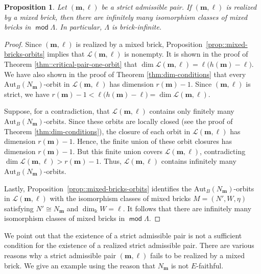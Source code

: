 \documentclass[a4,12pt]{amsart}
\numberwithin{equation}{section} %
\def\mod{\operatorname{\mathsf{mod}}}
\def\Aut{\mathrm{Aut}} %
\newtheorem{proposition}[theorem]{Proposition} %
\theoremstyle{definition} %
\begin{document}
\begin{proposition}\label{prop:strict-infinite-bricks}
Let $(\mathbf{m},\ell)$ be a strict admissible pair. If $(\mathbf{m},\ell)$ is realized by a mixed brick, then there are infinitely many isomorphism classes of mixed bricks in $\mod \Lambda$. In particular, $\Lambda$ is brick-infinite.
\end{proposition}
\begin{proof}
Since $(\mathbf{m},\ell)$ is realized by a mixed brick, Proposition~\ref{prop::mixed-bricks-orbits} implies that $\mathcal{L}(\mathbf{m},\ell)$ is nonempty. It is shown in the proof of Theorem \ref{thm::critical-pair-one-orbit} that $\dim \mathcal{L}(\mathbf{m},\ell)=\ell\bigl(h(\mathbf{m})-\ell\bigr)$. We have also shown in the proof of Theorem \ref{thm:dim-conditions} that every $\Aut_B(N_{\mathbf{m}})$-orbit in $\mathcal{L}(\mathbf{m},\ell)$ has dimension $r(\mathbf{m})-1$. Since $(\mathbf{m},\ell)$ is strict, we have $r(\mathbf{m})-1<\ell\bigl(h(\mathbf{m})-\ell\bigr)=\dim\mathcal{L}(\mathbf{m},\ell)$.

Suppose, for a contradiction, that $\mathcal{L}(\mathbf{m},\ell)$ contains only finitely many $\Aut_B(N_{\mathbf{m}})$-orbits. Since these orbits are locally closed (see the proof of Theorem \ref{thm:dim-conditions}), the closure of each orbit in $\mathcal{L}(\mathbf{m},\ell)$ has dimension $r(\mathbf{m})-1$. Hence, the finite union of these orbit closures has dimension $r(\mathbf{m})-1$. But this finite union covers $\mathcal{L}(\mathbf{m},\ell)$, contradicting $\dim\mathcal{L}(\mathbf{m},\ell)>r(\mathbf{m})-1$. Thus, $\mathcal{L}(\mathbf{m},\ell)$ contains infinitely many $\Aut_B(N_{\mathbf{m}})$-orbits.

Lastly, Proposition~\ref{prop::mixed-bricks-orbits} identifies the $\Aut_B(N_{\mathbf{m}})$-orbits in $\mathcal{L}(\mathbf{m},\ell)$ with the isomorphism classes of mixed bricks $M=(N',W,\eta)$ satisfying $N'\cong N_{\mathbf{m}}$ and $\dim_{\Bbbk} W=\ell$. It follows that there are infinitely many isomorphism classes of mixed bricks in $\mod \Lambda$.
\end{proof}

We point out that the existence of a strict admissible pair is not a sufficient condition for the existence of a realized strict admissible pair. There are various reasons why a strict admissible pair $(\mathbf{m},\ell)$ fails to be realized by a mixed brick. We give an example using the reason that $N_{\mathbf{m}}$ is not $E$-faithful. 
\end{document}
